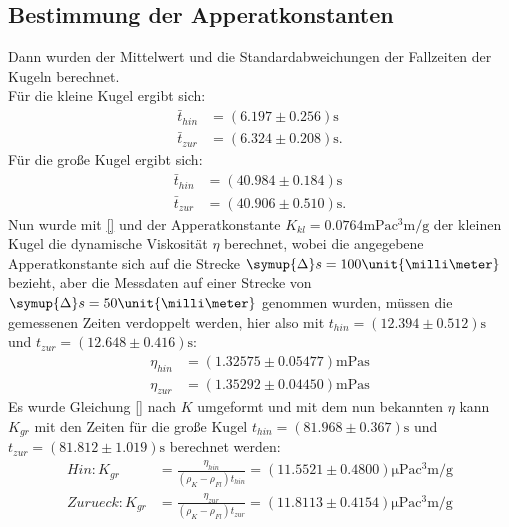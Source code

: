 \subsection{Bestimmung der Apperatkonstanten}
Dann wurden der Mittelwert und die Standardabweichungen der Fallzeiten der Kugeln berechnet.\\
Für die kleine Kugel ergibt sich:
\begin{align*}
  \bar{t}_{hin} &=(6.197\pm 0.256)\unit{\second}\\
  \bar{t}_{zur} &=(6.324\pm 0.208)\unit{\second}.
\end{align*}
Für die große Kugel ergibt sich:
\begin{align*}
  \bar{t}_{hin} &=(40.984\pm 0.184)\unit{\second}\\
  \bar{t}_{zur} &=(40.906\pm 0.510)\unit{\second}.
\end{align*}
Nun wurde mit \eqref{} und der Apperatkonstante $K_{kl} = 0.0764\unit{\milli\pascal\cubic\centi\meter\per\gram}$
der kleinen Kugel die dynamische Viskosität $\eta$ berechnet, wobei die angegebene Apperatkonstante sich auf die Strecke
$\symup{\Delta}s = 100\unit{\milli\meter}$ bezieht, aber die Messdaten auf einer Strecke von $\symup{\Delta}s = 50\unit{\milli\meter}$ genommen wurden,
müssen die gemessenen Zeiten verdoppelt werden, hier also mit $t_{hin} = (12.394\pm 0.512)\unit{\second}$ und $t_{zur} = (12.648\pm 0.416)\unit{\second}$:
\begin{align*}
  \eta_{hin} &= (1.32575\pm 0.05477)\unit{\milli\pascal\second}\\
  \eta_{zur} &= (1.35292\pm 0.04450)\unit{\milli\pascal\second}
\end{align*}
Es wurde Gleichung \eqref{} nach $K$ umgeformt und mit dem nun bekannten $\eta$ kann $K_{gr}$ mit
den Zeiten für die große Kugel $t_{hin} = (81.968\pm 0.367)\unit{\second}$ und $t_{zur} = (81.812\pm 1.019)\unit{\second}$ berechnet werden:
\begin{align*}
  Hin : K_{gr} &= \frac{\eta_{hin}}{(\rho_K-\rho_{Fl})t_{hin}} = (11.5521\pm 0.4800)\unit{\micro\pascal\cubic\centi\meter\per\gram}\\
  Zurueck : K_{gr} &= \frac{\eta_{zur}}{(\rho_K-\rho_{Fl})t_{zur}} = (11.8113\pm 0.4154)\unit{\micro\pascal\cubic\centi\meter\per\gram}
\end{align*}
